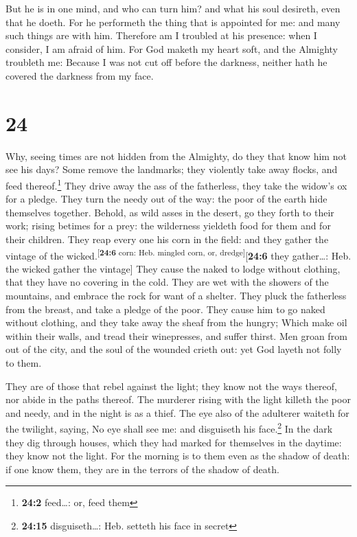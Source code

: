  But he is in one mind, and who can turn him? and what
his soul desireth, even that he doeth.  For he performeth
the thing that is appointed for me: and many such things are with him.
 Therefore am I troubled at his presence: when I
consider, I am afraid of him.  For God maketh my heart
soft, and the Almighty troubleth me:  Because I was not
cut off before the darkness, neither hath he covered the darkness from
my face.

\hypertarget{section-23}{%
\section{24}\label{section-23}}

 Why, seeing times are not hidden from the Almighty, do
they that know him not see his days?  Some remove the
landmarks; they violently take away flocks, and feed thereof.\footnote{\textbf{24:2}
  feed\ldots: or, feed them}  They drive away the ass of
the fatherless, they take the widow's ox for a pledge. 
They turn the needy out of the way: the poor of the earth hide
themselves together.  Behold, as wild asses in the desert,
go they forth to their work; rising betimes for a prey: the wilderness
yieldeth food for them and for their children.  They reap
every one his corn in the field: and they gather the vintage of the
wicked.\textsuperscript{{[}\textbf{24:6} corn: Heb. mingled corn, or,
dredge{]}}{[}\textbf{24:6} they gather\ldots: Heb. the wicked gather the
vintage{]}  They cause the naked to lodge without
clothing, that they have no covering in the cold.  They
are wet with the showers of the mountains, and embrace the rock for want
of a shelter.  They pluck the fatherless from the breast,
and take a pledge of the poor.  They cause him to go
naked without clothing, and they take away the sheaf from the hungry;
 Which make oil within their walls, and tread their
winepresses, and suffer thirst.  Men groan from out of
the city, and the soul of the wounded crieth out: yet God layeth not
folly to them.

 They are of those that rebel against the light; they
know not the ways thereof, nor abide in the paths thereof.
 The murderer rising with the light killeth the poor and
needy, and in the night is as a thief.  The eye also of
the adulterer waiteth for the twilight, saying, No eye shall see me: and
disguiseth his face.\footnote{\textbf{24:15} disguiseth\ldots: Heb.
  setteth his face in secret}  In the dark they dig
through houses, which they had marked for themselves in the daytime:
they know not the light.  For the morning is to them even
as the shadow of death: if one know them, they are in the terrors of the
shadow of death.

